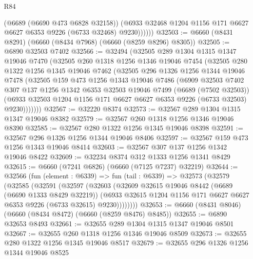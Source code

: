 \begin{lexlean}{R84}
\begin{coremodule}
              (@6689 (@6690 @473 @6828 @32158))
              (@6933 @32468 @1204 @1156 @171 @6627 @6627 @6353 @9226 (@6733 @32468) @9230))))))
@32503 := @6660 (@8431 @8291) (@6660 (@8434 @7968) (@6660 (@8259 @8296) @8305))
@32505 := @6890 @32503 @7402
@32566 := @32494
    (@32505
      @289
      @1304
      @1315
      @1347
      @19046
      @7470
      (@32505
        @260
        @1318
        @1256
        @1346
        @19046
        @7454
        (@32505
          @280
          @1322
          @1256
          @1345
          @19046
          @7462
          (@32505
            @296
            @1326
            @1256
            @1344
            @19046
            @7478
            (@32505
              @159
              @473
              @1256
              @1343
              @19046
              @7486
              (@6909
                @32503
                @7402
                @307
                @137
                @1256
                @1342
                @6353
                @32503
                @19046
                @7499
                (@6689 (@7502 @32503))
                (@6933 @32503 @1204 @1156 @171 @6627 @6627 @6353 @9226 (@6733 @32503) @9230)))))))
@32567 := @32220 @8374
@32573 := @32567 @289 @1304 @1315 @1347 @19046 @8382
@32579 := @32567 @260 @1318 @1256 @1346 @19046 @8390
@32585 := @32567 @280 @1322 @1256 @1345 @19046 @8398
@32591 := @32567 @296 @1326 @1256 @1344 @19046 @8406
@32597 := @32567 @159 @473 @1256 @1343 @19046 @8414
@32603 := @32567 @307 @137 @1256 @1342 @19046 @8422
@32609 := @32234 @8374 @312 @1333 @1256 @1341 @8429
@32615 := @6660 (@7241 @6826) (@6660 (@7125 @7237) @32219)
@32644 := @32566
    (fun (element : @6339) =>
    fun (tail : @6339) =>
    @32573
      (@32579
        (@32585
          (@32591
            (@32597
              (@32603
                (@32609
                  @32615
                  @19046
                  @8442
                  (@6689 (@6690 @1333 @8429 @32219))
                  (@6933
                    @32615
                    @1204
                    @1156
                    @171
                    @6627
                    @6627
                    @6353
                    @9226
                    (@6733 @32615)
                    @9230))))))))
@32653 := @6660 (@8431 @8046) (@6660 (@8434 @8472) (@6660 (@8259 @8476) @8485))
@32655 := @6890 @32653 @8493
@32661 := @32655 @289 @1304 @1315 @1347 @19046 @8501
@32667 := @32655 @260 @1318 @1256 @1346 @19046 @8509
@32673 := @32655 @280 @1322 @1256 @1345 @19046 @8517
@32679 := @32655 @296 @1326 @1256 @1344 @19046 @8525

\end{coremodule}
\end{lexlean}

